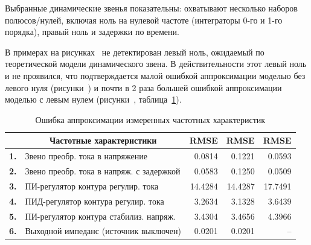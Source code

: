 Выбранные динамические звенья показательны: охватывают несколько наборов полюсов/нулей, включая ноль на нулевой частоте (интеграторы 0-го и 1-го порядка), правый ноль и задержки по времени.

В примерах на рисунках~ не детектирован левый ноль, ожидаемый по теоретической модели динамического звена. В действительности этот левый ноль и не проявился, что подтверждается малой ошибкой аппроксимации моделью без левого нуля (рисунки~) и почти в 2 раза большей ошибкой аппроксимации моделью с левым нулем (рисунки~, таблица~\ref{tbl:experiment_rmse}).

\begin{table}[htbp]
    \caption{Ошибка аппроксимации измеренных частотных характеристик}
    \label{tbl:experiment_rmse}
    \begin{threeparttable}
        \begin{tabular}{|l|l|l|l|l|}
            \hline
            & \multicolumn{1}{c|}{\textbf{Частотные характеристики}} & \multicolumn{1}{c|}{\textbf{RMSE\tnote{1}}} & \multicolumn{1}{c|}{\textbf{RMSE\tnote{2}}} & \multicolumn{1}{c|}{\textbf{RMSE\tnote{3}}} \\ \hline
            \textbf{1.} & Звено преобр. тока в напряжение & \multicolumn{1}{r|}{\num{0.0814}} & \multicolumn{1}{r|}{\num{0.1221}} & \multicolumn{1}{r|}{\num{0.0593}}\\ \hline
            \textbf{2.} & Звено преобр. тока в напряж. с задержкой & \multicolumn{1}{r|}{\num{0.0583}} & \multicolumn{1}{r|}{\num{0.1250}} & \multicolumn{1}{r|}{\num{0.0509}}\\ \hline
            \textbf{3.} & ПИ-регулятор контура регулир. тока & \multicolumn{1}{r|}{\num{14.4284}} & \multicolumn{1}{r|}{\num{14.4287}} & \multicolumn{1}{r|}{\num{17.7491}}\\ \hline
			\textbf{4.} & ПИД-регулятор контура регулир. тока & \multicolumn{1}{r|}{\num{3.2634}} & \multicolumn{1}{r|}{\num{3.1328}} & \multicolumn{1}{r|}{\num{3.6439}}\\ \hline
			\textbf{5.} & ПИ-регулятор контура стабилиз. напряж. & \multicolumn{1}{r|}{\num{3.4304}} & \multicolumn{1}{r|}{\num{3.4656}} & \multicolumn{1}{r|}{\num{4.3966}}\\ \hline
			\textbf{6.} & Выходной импеданс (источник выключен) & \multicolumn{1}{r|}{\num{0.0201}} & \multicolumn{1}{r|}{\num{0.0201}} & \multicolumn{1}{r|}{--}\\ \hline

\end{tabular}
\end{threeparttable}
\end{table}
